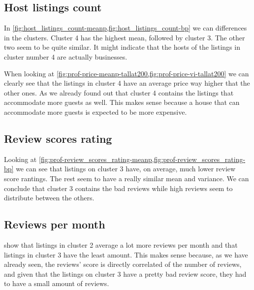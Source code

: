\clearpage
\subsection{Host listings count}%

In \cref{fig:host_listings_count-meanp,fig:host_listings_count-bp} we can differences in the clusters.
Cluster 4 has the highest mean, followed by cluster 3. The other two seem to be quite 
similar. It might indicate that the hosts of the listings in cluster number 4 are actually businesses.

When looking at \cref{fig:prof-price-meanp-tallat200,fig:prof-price-vi-tallat200} we can clearly see that the listings in cluster 4 have an average price way higher that the other ones. As we already found out that cluster 4 contains the listings that accommodate more guests as well. This makes sense because a house that can accommodate more guests is expected to be more expensive. 


\subsection{Review scores rating}%
\label{sub:prof-review_scores_rating}


Looking at \cref{fig:prof-review_scores_rating-meanp,fig:prof-review_scores_rating-bp} we can see that listings on cluster 3 have, on average, much lower review score rantings. The rest seem to have a really similar mean and variance. We can conclude that cluster 3 contains the bad reviews while high reviews seem to distribute between the others.

\clearpage
\subsection{Reviews per month}%


 show that listings in cluster 2 average a lot more reviews per month and that listings in
cluster 3 have the least amount. This makes sense because, as we have already seen, the reviews' score is directly correlated of the number of reviews, and given that the listings on cluster 3 have a pretty bad review score, they had to have a small amount of reviews.



